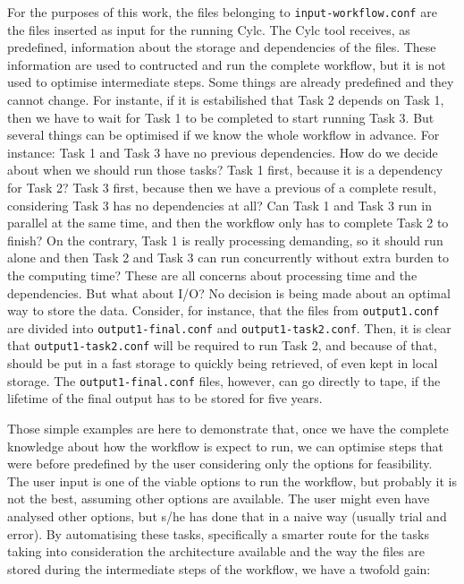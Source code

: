 \documentclass[a4paper]{article}
\begin{document}
For the purposes of this work, the files belonging to \texttt{input-workflow.conf} are the files inserted as input for the running Cylc. The Cylc tool receives, as predefined, information about the storage and dependencies of the files. These information are used to contructed and run the complete workflow, but it is not used to optimise intermediate steps. Some things are already predefined and they cannot change. For instante, if it is estabilished that Task 2 depends on Task 1, then we have to wait for Task 1 to be completed to start running Task 3. But several things can be optimised if we know the whole workflow in advance. For instance: Task 1 and Task 3 have no previous dependencies. How do we decide about when we should run those tasks? Task 1 first, because it is a dependency for Task 2? Task 3 first, because then we have a previous of a complete result, considering Task 3 has no dependencies at all? Can Task 1 and Task 3 run in parallel at the same time, and then the workflow only has to complete Task 2 to finish? On the contrary, Task 1 is really processing demanding, so it should run alone and then Task 2 and Task 3 can run concurrently without extra burden to the computing time? These are all concerns about processing time and the dependencies. But what about I/O? No decision is being made about an optimal way to store the data. Consider, for instance, that the files from \texttt{output1.conf} are divided into \texttt{output1-final.conf} and \texttt{output1-task2.conf}. Then, it is clear that \texttt{output1-task2.conf} will be required to run Task 2, and because of that, should be put in a fast storage to quickly being retrieved, of even kept in local storage. The \texttt{output1-final.conf} files, however, can go directly to tape, if the lifetime of the final output has to be stored for five years.

Those simple examples are here to demonstrate that, once we have the complete knowledge about how the workflow is expect to run, we can optimise steps that were before predefined by the user considering only the options for feasibility. The user input is one of the viable options to run the workflow, but probably it is not the best, assuming other options are available. The user might even have analysed other options, but s/he has done that in a naive way (usually trial and error). By automatising these tasks, specifically a smarter route for the tasks taking into consideration the architecture available and the way the files are stored during the intermediate steps of the workflow, we have a twofold gain:
\end{document}
